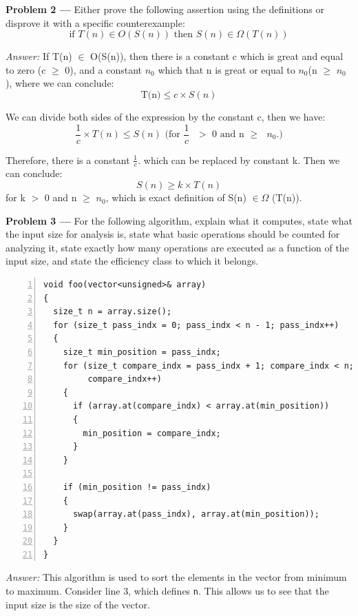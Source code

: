 \documentclass[11pt]{article}
\newcommand{\problem}[1]{\textbf{Problem #1 ---} }
\newcommand{\answer}{\textit{Answer: } }
\begin{document}

\problem{2} Either prove the following assertion using the definitions
or disprove it with a specific counterexample:
\[\text{if } T(n) \in O(S(n)) \text{ then } S(n) \in \Omega(T(n))\]

\answer If T(n) $\in$ O(S(n)), then there is a constant c which is great and equal to zero 
(c $\geq$ 0), and a constant $n_0$ which that n is great or equal to $n_0$(n $\geq$ $n_0$), where we can conclude:
\[\text{T(n)} \leq c \times S(n)\]

We can divide both sides of the expression by the constant c, then we have:
\[\frac{1}{c} \times T(n) \leq S(n) \text{ (for $\frac{1}{c}$ $>$ 0 and n $\geq$ $n_0$.)}\]


Therefore, there is a constant $\frac{1}{c}$. which can be replaced by constant k. Then we can conclude:
\[
S(n) \geq k \times T(n)
\]
for k $>$ 0 and n $\geq$ $n_0$, which is exact definition of S(n) $\in \Omega$ (T(n)).

\problem{3} For the following algorithm, explain what it computes,
state what the input size for analysis is, state what basic operations
should be counted for analyzing it, state exactly how many operations
are executed as a function of the input size, and state the efficiency
class to which it belongs.

\begin{Verbatim}[numbers=left,xleftmargin=5mm]
void foo(vector<unsigned>& array)
{
  size_t n = array.size();
  for (size_t pass_indx = 0; pass_indx < n - 1; pass_indx++)
  {
    size_t min_position = pass_indx;
    for (size_t compare_indx = pass_indx + 1; compare_indx < n; 
         compare_indx++)
    {
      if (array.at(compare_indx) < array.at(min_position))
      {
        min_position = compare_indx;
      }
    }

    if (min_position != pass_indx)
    {
      swap(array.at(pass_indx), array.at(min_position));
    }
  }
}
\end{Verbatim}

\answer This algorithm is used to sort the elements in the vector from minimum to maximum.
Consider line 3, which defines \texttt{n}. This allows us to see
that the input size is the size of the vector. 
\end{document}
